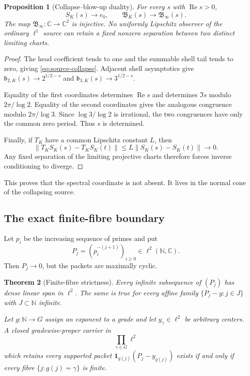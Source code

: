 \documentclass[11pt]{article}
\newtheorem{theorem}{Theorem}[section]
\newtheorem{proposition}[theorem]{Proposition}
\theoremstyle{definition}
\theoremstyle{remark}
\newcommand{\C}{\mathbb C}
\newcommand{\N}{\mathbb N}
\newcommand{\Rea}{\operatorname{Re}}
\begin{document}
\begin{proposition}[Collapse--blow-up duality]
\label{prop:blowup}
For every \(s\) with \(\Rea s>0\),
\[
 S_K(s)\to e_0,\qquad
 \mathfrak B_K(s)\to\mathfrak B_\infty(s).
\tag{3.4}\label{eq:collapse-blowup}
\]
The map \(\mathfrak B_\infty:\C\to\C^2\) is injective.  No uniformly
Lipschitz observer of the ordinary \(\ell^1\) source can retain a fixed
nonzero separation between two distinct limiting charts.
\end{proposition}

\begin{proof}
The head coefficient tends to one and the summable shell tail tends to
zero, giving \eqref{eq:source-collapse}.  Adjacent shell asymptotics give
\(\mathfrak b_{2,K}(s)\to2^{1/2-s}\) and
\(\mathfrak b_{3,K}(s)\to3^{1/2-s}\).

Equality of the first coordinates determines \(\Rea s\) and determines
\(\Im s\) modulo \(2\pi/\log2\).  Equality of the second coordinates
gives the analogous congruence modulo \(2\pi/\log3\).  Since
\(\log3/\log2\) is irrational, the two congruences have only the common
zero period.  Thus \(s\) is determined.

Finally, if \(T_K\) have a common Lipschitz constant \(L\), then
\[
 \|T_KS_K(s)-T_KS_K(t)\|
 \le L\|S_K(s)-S_K(t)\|\longrightarrow0.
\]
Any fixed separation of the limiting projective charts therefore forces
inverse conditioning to diverge.
\end{proof}

This proves that the spectral coordinate is not absent.  It lives in the
normal cone of the collapsing source.

\subsection{The exact finite-fibre boundary}

Let \(p_i\) be the increasing sequence of primes and put
\[
             P_j=(p_i^{-(j+1)})_{i\ge0}\in\ell^2(\N,\C).
\tag{3.5}\label{eq:prime-packet}
\]
Then \(P_j\to0\), but the packets are maximally cyclic.

\begin{theorem}[Finite-fibre strictness]
\label{thm:finite-fibre}
Every infinite subsequence of \((P_j)\) has dense linear span in
\(\ell^2\).  The same is true for every affine family
\(\{P_j-y:j\in J\}\) with \(J\subset\N\) infinite.

Let \(g:\N\to G\) assign an exponent to a grade and let \(y_\gamma\in
\ell^2\) be arbitrary centers.  A closed gradewise-proper carrier in
\[
                  \prod_{\gamma\in G}\ell^2
\]
which retains every supported packet
\(\mathbf 1_{g(j)}(P_j-y_{g(j)})\) exists if and only if every fibre
\(\{j:g(j)=\gamma\}\) is finite.
\end{theorem}
\end{document}
